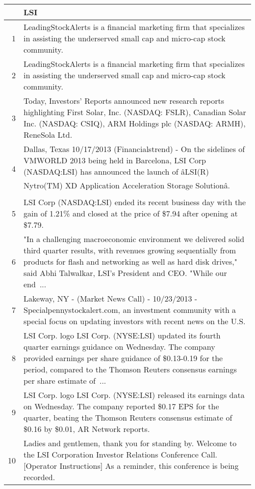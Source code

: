 \documentclass{tufte-handout}\usepackage[]{graphicx}\usepackage[]{color}
\begin{document}
\begin{tabularx}{\textwidth}{rX}
  \hline
 & LSI \\ 
  \hline
1 &  LeadingStockAlerts is a financial marketing firm that specializes in assisting the underserved small cap and micro-cap stock community.  \\ 
  2 &  LeadingStockAlerts is a financial marketing firm that specializes in assisting the underserved small cap and micro-cap stock community.  \\ 
  3 &  Today, Investors' Reports announced new research reports highlighting First Solar, Inc. (NASDAQ: FSLR), Canadian Solar Inc. (NASDAQ: CSIQ), ARM Holdings plc (NASDAQ: ARMH), ReneSola Ltd.  \\ 
  4 &  Dallas, Texas 10/17/2013 (Financialstrend) - On the sidelines of VMWORLD 2013 being held in Barcelona, LSI Corp (NASDAQ:LSI) has announced the launch of âLSI(R) Nytro(TM) XD Application Acceleration Storage Solutionâ.  \\ 
  5 &  LSI Corp (NASDAQ:LSI) ended its recent business day with the gain of 1.21\% and closed at the price of \$7.94 after opening at \$7.79.  \\ 
  6 &  "In a challenging macroeconomic environment we delivered solid third quarter results, with revenues growing sequentially from products for flash and networking as well as hard disk drives," said Abhi Talwalkar, LSI's President and CEO. "While our end ...  \\ 
  7 &  Lakeway, NY - (Market News Call) - 10/23/2013 - Specialpennystockalert.com, an investment community with a special focus on updating investors with recent news on the U.S.  \\ 
  8 &  LSI Corp. logo LSI Corp. (NYSE:LSI) updated its fourth quarter earnings guidance on Wednesday. The company provided earnings per share guidance of \$0.13-0.19 for the period, compared to the Thomson Reuters consensus earnings per share estimate of ...  \\ 
  9 &  LSI Corp. logo LSI Corp. (NYSE:LSI) released its earnings data on Wednesday. The company reported \$0.17 EPS for the quarter, beating the Thomson Reuters consensus estimate of \$0.16 by \$0.01, AR Network reports.  \\ 
  10 &  Ladies and gentlemen, thank you for standing by. Welcome to the LSI Corporation Investor Relations Conference Call. [Operator Instructions] As a reminder, this conference is being recorded.  \\ 
   \hline
\end{tabularx}
\end{document}
